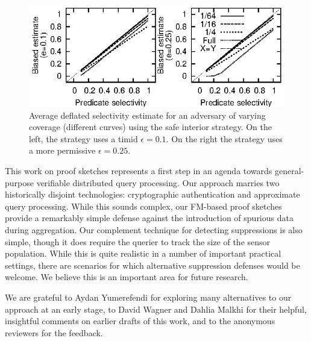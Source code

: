 \documentclass[10pt,twocolumn]{article}
\newcommand{\proofsketches}{proof sketches\xspace}
\newcommand\vpar{{\vspace*{0.3em}}}
\newcommand{\stitle}[1]{\vpar\noindent{\bf #1\/}}
\begin{document}
\begin{figure}
  \centerline{\includegraphics{results/safeInterior}}
  \caption{Average deflated selectivity estimate for an adversary of varying coverage
    (different curves) using the safe interior strategy.  On the left, the
    strategy uses a timid $\epsilon=0.1$.  On the right the
    strategy uses a more permissive $\epsilon=0.25$.}
  \label{fig:safeInterior}
\vspace*{-2em}
\end{figure}


\vspace*{-1em}
This work on \proofsketches represents a first step in
an agenda towards general-purpose verifiable distributed query processing.
Our approach marries two historically disjoint technologies: cryptographic
authentication and approximate query processing.  While this sounds
complex, our FM-based \proofsketches provide a remarkably simple
defense against the introduction of spurious data during aggregation.
Our complement technique for detecting suppressions is also
simple, though it does require the querier to
track the size of the sensor population.  While
this is quite realistic in a number of important practical settings,
there are scenarios for which alternative suppression
defenses would be welcome. We believe this is an important area for
future research.

\stitle{Acknowledgments} We are grateful to Aydan Yumerefendi for exploring many alternatives to
our approach at an early stage, to David Wagner and Dahlia Malkhi
for their helpful, insightful comments on earlier drafts of this work,
and to the
anonymous reviewers for the feedback.


\end{document}
